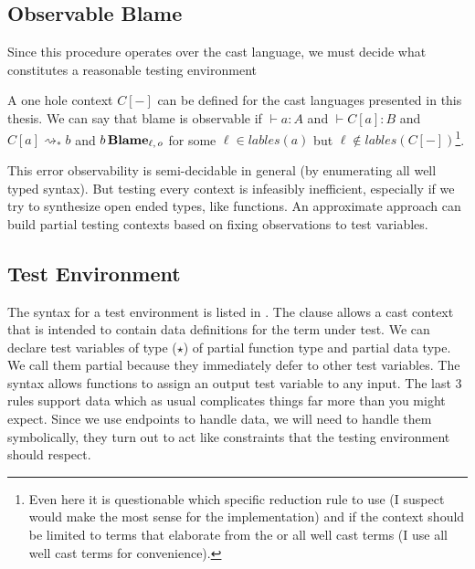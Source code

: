 \subsection{Observable Blame}
Since this procedure operates over the cast language, we must decide what constitutes a reasonable testing environment
 
A one hole context $C[-]$ can be defined for the cast languages presented in this thesis.
We can say that blame is observable if $\vdash a:A$ and $\vdash C[a]:B$ and $C[a]\rightsquigarrow_{*}b$ and $b\,\textbf{Blame}{}_{\ell, \,o}$ for some $\ell \in lables\left(a\right)$ but $\ell \notin lables\left(C[-]\right)$\footnote{
 Even here it is questionable which specific reduction rule to use (I suspect \cbv{} would make the most sense for the implementation) and if the context should be limited to terms that elaborate from the \slang{} or all well cast terms (I use all well cast terms for convenience).
}.
 
This error observability is semi-decidable in general (by enumerating all well typed syntax).
But testing every context is infeasibly inefficient, especially if we try to synthesize open ended types, like functions.
An approximate approach can build partial testing contexts based on fixing observations to test variables.
 
 
\subsection{Test Environment}
The syntax for a test environment is listed in .
The clause allows a cast context that is intended to contain data definitions for the term under test.
We can declare test variables of type ($\star$) of partial function type and partial data type.
We call them partial because they immediately defer to other test variables.
The syntax allows functions to assign an output test variable to any input.
The last 3 rules support data which as usual complicates things far more than you might expect.
Since we use endpoints to handle data, we will need to handle them symbolically, they turn out to act like constraints that the testing environment should respect.

